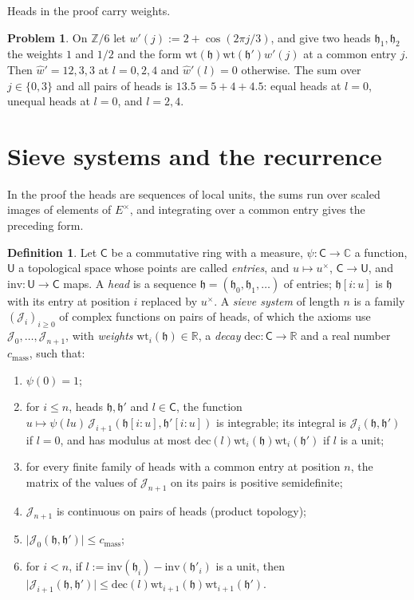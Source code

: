 \documentclass[reqno]{amsart}
\theoremstyle{definition}
\newtheorem{problem}{Problem}[section]
\newtheorem{definition}{Definition}[section]
\theoremstyle{plain}
\theoremstyle{remark}
\newcommand{\Z}{\mathbb{Z}}
\newcommand{\C}{\mathbb{C}}
\newcommand{\R}{\mathbb{R}}
\newcommand{\Jc}{\mathcal{J}}
\newcommand{\hh}{\mathfrak{h}}
\newcommand{\wt}{\mathrm{wt}}
\newcommand{\dec}{\mathrm{dec}}
\newcommand{\cm}{c_{\mathrm{mass}}}
\newcommand{\Cs}{\mathsf{C}}
\newcommand{\Us}{\mathsf{U}}
\newcommand{\inv}{\mathrm{inv}}
\begin{document}
Heads in the proof carry weights.

\begin{problem}\label{pr:model-weights}
On \(\Z/6\) let \(w'(j):=2+\cos(2\pi j/3)\), and give two heads \(\hh_1,\hh_2\) the weights \(1\) and \(1/2\) and the form \(\wt(\hh)\wt(\hh')w'(j)\) at a common entry \(j\).  Then \(\hat w'=12,3,3\) at \(l=0,2,4\) and \(\hat w'(l)=0\) otherwise.  The sum over \(j\in\{0,3\}\) and all pairs of heads is \(13.5=5+4+4.5\): equal heads at \(l=0\), unequal heads at \(l=0\), and \(l=2,4\).
\end{problem}

\section{Sieve systems and the recurrence}\label{sec:recurrence}

In the proof the heads are sequences of local units, the sums run over scaled images of elements of \(E^\times\), and integrating over a common entry gives the preceding form.

\begin{definition}\label{def:sieve-system}
Let \(\Cs\) be a commutative ring with a measure, \(\psi\colon\Cs\to\C\) a function, \(\Us\) a topological space whose points are called \emph{entries}, and \(u\mapsto u^\times\), \(\Cs\to\Us\), and \(\inv\colon\Us\to\Cs\) maps.  A \emph{head} is a sequence \(\hh=(\hh_0,\hh_1,\dots)\) of entries; \(\hh[i{:}u]\) is \(\hh\) with its entry at position \(i\) replaced by \(u^\times\).  A \emph{sieve system} of length \(n\) is a family \((\Jc_i)_{i\ge0}\) of complex functions on pairs of heads, of which the axioms use \(\Jc_0,\dots,\Jc_{n+1}\), with \emph{weights} \(\wt_i(\hh)\in\R\), a \emph{decay} \(\dec\colon\Cs\to\R\) and a real number \(\cm\), such that:
\begin{enumerate}
\item[(i)] \(\psi(0)=1\);
\item[(ii)] for \(i\le n\), heads \(\hh,\hh'\) and \(l\in\Cs\), the function \(u\mapsto\psi(lu)\,\Jc_{i+1}(\hh[i{:}u],\hh'[i{:}u])\) is integrable; its integral is \(\Jc_i(\hh,\hh')\) if \(l=0\), and has modulus at most \(\dec(l)\wt_i(\hh)\wt_i(\hh')\) if \(l\) is a unit;
\item[(iii)] for every finite family of heads with a common entry at position \(n\), the matrix of the values of \(\Jc_{n+1}\) on its pairs is positive semidefinite;
\item[(iv)] \(\Jc_{n+1}\) is continuous on pairs of heads (product topology);
\item[(v)] \(\lvert\Jc_0(\hh,\hh')\rvert\le\cm\);
\item[(vi)] for \(i<n\), if \(l:=\inv(\hh_i)-\inv(\hh'_i)\) is a unit, then \(\lvert\Jc_{i+1}(\hh,\hh')\rvert\le\dec(l)\wt_{i+1}(\hh)\wt_{i+1}(\hh')\).
\end{enumerate}
\end{definition}
\end{document}
